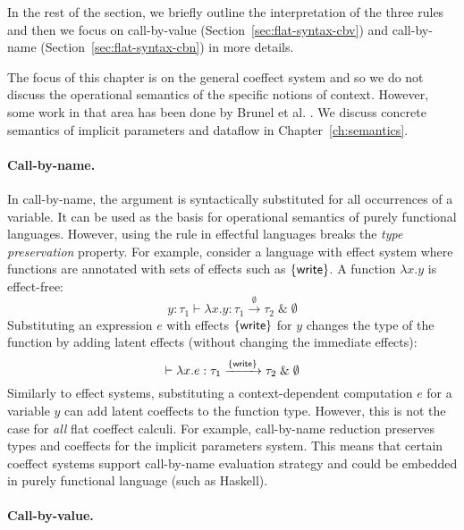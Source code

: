 In the rest of the section, we briefly outline the interpretation of the three
rules and then we focus on call-by-value (Section~\ref{sec:flat-syntax-cbv}) and call-by-name
(Section~\ref{sec:flat-syntax-cbn}) in more details.

The focus of this chapter is on the general coeffect system and so we do not discuss the operational
semantics of the specific notions of context. However, some work in that area has been done
by Brunel et al. \cite{coeffects-quantitative}. We discuss concrete semantics of implicit
parameters and dataflow in Chapter~\ref{ch:semantics}.

\paragraph{Call-by-name.}
In call-by-name, the argument is syntactically substituted for all occurrences of a variable. It
can be used as the basis for operational semantics of purely functional languages. However, using
the rule in effectful languages breaks the \emph{type preservation} property. For example, consider
a language with effect system where functions are annotated with sets of effects such as $\{ \textnormal{\sffamily write} \}$.
A function $\lambda x.y$ is effect-free:
%
\begin{equation*}
y\!:\!\tau_1 \vdash \lambda x.y : \tau_1 \xrightarrow{\emptyset} \tau_2 \;\&\; \emptyset
\end{equation*}
%
Substituting an expression $e$ with effects $\{ \textnormal{\sffamily write} \}$ for $y$ changes the type of
the function by adding latent effects (without changing the immediate effects):
%
\begin{equation*}
\vdash \lambda x.e : \tau_1 \xrightarrow{ \{ \textnormal{\sffamily write} \} } \tau_2 \;\&\; \emptyset
\end{equation*}
%
Similarly to effect systems, substituting a context-dependent computation $e$ for a variable $y$ can
add latent coeffects to the function type. However, this is not the case for \emph{all} flat coeffect
calculi. For example, call-by-name reduction preserves types and coeffects for the implicit
parameters system. This means that certain coeffect systems support call-by-name evaluation strategy
and could be embedded in purely functional language (such as Haskell).

\paragraph{Call-by-value.}

